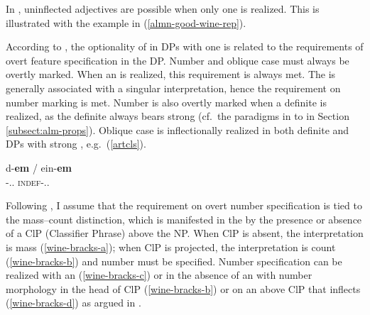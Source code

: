 \documentclass[output=paper,colorlinks,citecolor=brown]{langscibook}
\begin{document}


In , uninflected adjectives are possible when only one  is realized. This is illustrated with the example in (\ref{almn-good-wine-rep}). %

\ea {} \label{almn-good-wine-rep}
\z
\z 

According to \citet{Rehn2019}, the optionality of  in DPs with one   is related to the requirements of overt feature specification in the  DP. Number and oblique case must always be overtly marked. When an  is realized, this requirement is always met. The   is generally associated with a singular interpretation, hence the requirement on number marking is met. Number is also overtly marked when a definite  is realized, as the definite  always bears strong  (cf.~the  paradigms in  to  in Section \ref{subsect:alm-props}). Oblique case is inflectionally realized in both definite and  DPs with strong , e.g.~(\ref{artcls}). %

\ea \label{artcls}
\gll d-\textbf{em} / ein-\textbf{em}\\
\DEF-\MASC.\DAT.\SG{} {} \textsc{indef}-\MASC.\DAT.\SG{}\\ 
\glt {}
\z 

Following \citet{borer2005structuring},  I assume that the requirement on overt number specification is tied to the mass--count distinction, which is manifested in the  by the presence or absence of a ClP (Classifier Phrase) above the NP. When ClP is absent, the interpretation is mass (\ref{wine-bracks-a}); when ClP is projected, the interpretation is count (\ref{wine-bracks-b}) and number must be specified. Number specification can be realized with an  (\ref{wine-bracks-c}) or in the absence of an  with number morphology in the head of ClP (\ref{wine-bracks-b}) or on an  above ClP that inflects (\ref{wine-bracks-d}) as argued in \citet{Rehn2019}.
\end{document}
